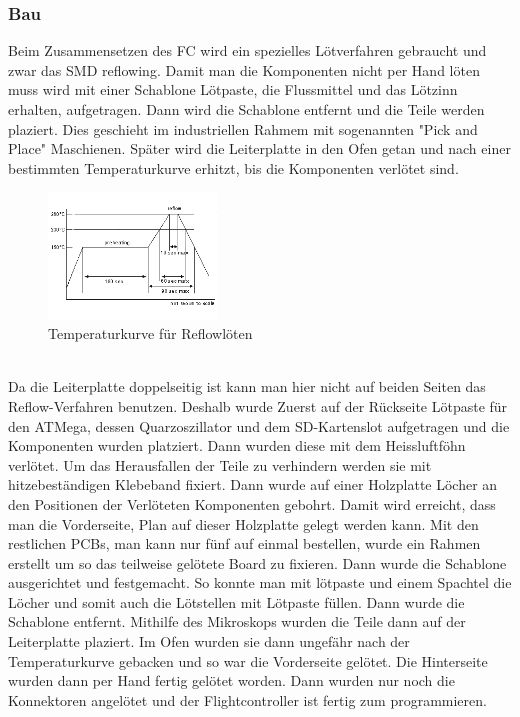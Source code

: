 \documentclass[12pt,a4paper, ngerman]{article}
\begin{document}
\subsubsection{Bau}
Beim Zusammensetzen des FC wird ein spezielles Lötverfahren gebraucht und zwar das SMD reflowing. Damit man die Komponenten nicht per Hand löten muss wird mit einer Schablone Lötpaste, die Flussmittel und das Lötzinn erhalten, aufgetragen. Dann wird die Schablone entfernt und die Teile werden plaziert. Dies geschieht im industriellen Rahmem mit sogenannten "Pick and Place" Maschienen. Später wird die Leiterplatte in den Ofen getan und nach einer bestimmten Temperaturkurve erhitzt, bis die Komponenten verlötet sind\cite{website:sauter-elektronik.de_reflow}.
\begin{figure}[h]
\centering
\includegraphics[width=0.4\textwidth]{reflow.png}
\caption[http://www.comtec-crystals.com/service-5.php]{Temperaturkurve für Reflowlöten}
\end{figure} \\
Da die Leiterplatte doppelseitig ist kann man hier nicht auf beiden Seiten das Reflow-Verfahren benutzen. Deshalb wurde Zuerst auf der Rückseite Lötpaste für den ATMega, dessen Quarzoszillator und dem SD-Kartenslot aufgetragen und die Komponenten wurden platziert. Dann wurden diese mit dem Heissluftföhn verlötet. Um das Herausfallen der Teile zu verhindern werden sie mit hitzebeständigen Klebeband fixiert.
Dann wurde auf einer Holzplatte Löcher an den Positionen der Verlöteten Komponenten gebohrt. Damit wird erreicht, dass man die Vorderseite, Plan auf dieser Holzplatte gelegt werden kann. Mit den restlichen PCBs, man kann nur fünf auf einmal bestellen, wurde ein Rahmen erstellt um so das teilweise gelötete Board zu fixieren. Dann wurde die Schablone ausgerichtet und festgemacht. So konnte man mit lötpaste und einem Spachtel die Löcher und somit auch die Lötstellen mit Lötpaste füllen. Dann wurde die Schablone entfernt. Mithilfe des Mikroskops wurden die Teile dann auf der Leiterplatte plaziert. Im Ofen wurden sie dann ungefähr nach der Temperaturkurve gebacken und so war die Vorderseite gelötet. Die Hinterseite wurden dann per Hand fertig gelötet worden. Dann wurden nur noch die Konnektoren angelötet und der Flightcontroller ist fertig zum programmieren.
\end{document}
